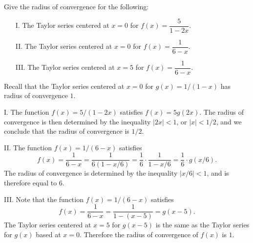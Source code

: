 \documentclass[]{ximera}
\begin{document}
\begin{problem} Give the radius of convergence for the following:
\begin{itemize}
\item[I.] The Taylor series centered at $x=0$ for $f(x) = \dfrac{5}{1-2x}$.
\item[II.] The Taylor series centered at $x=0$ for $f(x) = \dfrac{1}{6-x}$.
\item[III.] The Taylor series centered at $x=5$ for $f(x) = \dfrac{1}{6-x}$.
\end{itemize}

\begin{solution}
Recall that the Taylor series centered at $x=0$ for $g(x) = 1/(1-x)$ has radius of convergence $1$. 

I. The function $f(x) = 5/(1-2x)$ satisfies $f(x) = 5 g(2x)$. The radius of convergence is then determined by the inequality $|2x| < 1$, or $|x| < 1/2$, and we conclude that the radius of convergence is $1/2$. 

II. The function $f(x) = 1/(6-x)$ satisfies
$$
f(x) = \frac{1}{6-x} = \frac{1}{6(1-x/6)} = \frac{1}{6} \cdot \frac{1}{1-x/6} = \frac{1}{6} \cdot g(x/6). 
$$
The radius of convergence is determined by the inequality $|x/6| < 1$, and is therefore equal to $6$.

III. Note that the function $f(x) = 1/(6-x)$ satisfies 
$$
f(x) = \frac{1}{6-x} = \frac{1}{1-(x-5)} = g(x-5).
$$
The Taylor series centered at $x=5$ for $g(x-5)$ is the same as the Taylor series for $g(x)$ based at $x=0$. Therefore the radius of convergence of $f(x)$ is $1$.
\end{solution}
\end{problem}
\end{document}
